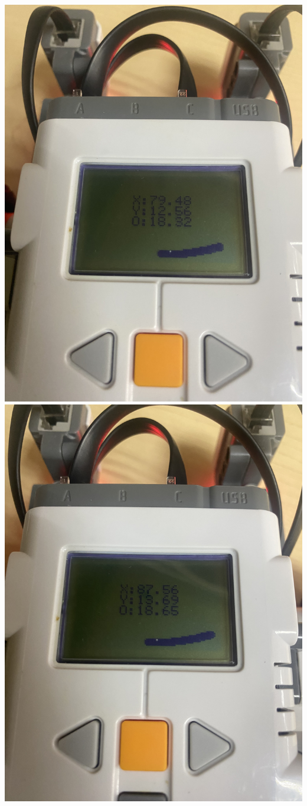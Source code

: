 \documentclass[oneside,twocolumn]{article}
\begin{document}
\includegraphics[scale=0.09]{graficos/error2.png}
\includegraphics[scale=0.09]{graficos/error3.png}
\newpage
\twocolumn
\end{document}
